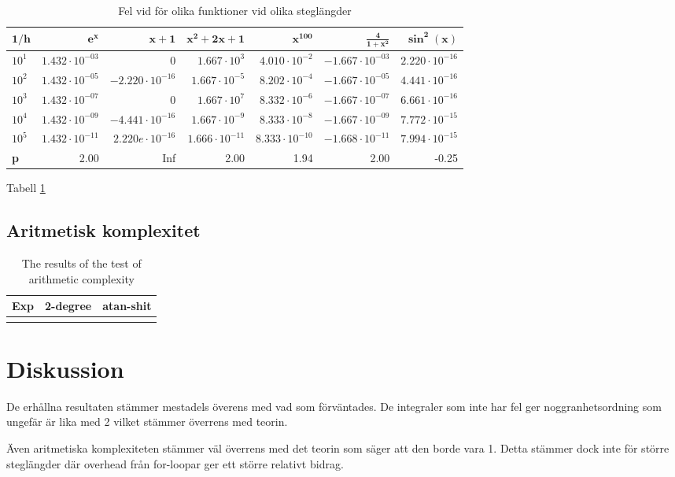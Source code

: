 \documentclass[a4paper,titlepage]{article}
\begin{document}
\begin{table}[h]
    \begin{tabular}{l | r | r | r | r | r | r}
        $\mathbf{1/h}$ & $\mathbf{e^x}$ & $\mathbf{x + 1}$ & $\mathbf{x^2 + 2x + 1}$ & $\mathbf{x^{100}}$ & $\mathbf{\frac{4}{1 + x^2}}$ & $\mathbf{\sin^2(x)}$ \\ \hline
        $10^1$         & $1.432 \cdot 10^{-03}$ & $0                    $  & $1.667 \cdot 10^{3}  $ & $4.010 \cdot 10^{-2} $ & $-1.667 \cdot 10^{-03}$ & $2.220 \cdot 10^{-16}$ \\
        $10^2$         & $1.432 \cdot 10^{-05}$ & $-2.220 \cdot 10^{-16}$  & $1.667 \cdot 10^{-5} $ & $8.202 \cdot 10^{-4} $ & $-1.667 \cdot 10^{-05}$ & $4.441 \cdot 10^{-16}$ \\
        $10^3$         & $1.432 \cdot 10^{-07}$ & $0                    $  & $1.667 \cdot 10^{7}  $ & $8.332 \cdot 10^{-6} $ & $-1.667 \cdot 10^{-07}$ & $6.661 \cdot 10^{-16}$ \\
        $10^4$         & $1.432 \cdot 10^{-09}$ & $-4.441 \cdot 10^{-16}$  & $1.667 \cdot 10^{-9} $ & $8.333 \cdot 10^{-8} $ & $-1.667 \cdot 10^{-09}$ & $7.772 \cdot 10^{-15}$ \\
        $10^5$         & $1.432 \cdot 10^{-11}$ & $2.220e \cdot 10^{-16}$  & $1.666 \cdot 10^{-11}$ & $8.333 \cdot 10^{-10}$ & $-1.668 \cdot 10^{-11}$ & $7.994 \cdot 10^{-15}$ \\ \hline
        \textbf{p}     & 2.00                   & Inf                      & 2.00                   & 1.94                   & 2.00                    & -0.25 \\
    \end{tabular}
    \caption{Fel vid för olika funktioner vid olika steglängder}
    \label{tab:errors}
\end{table}

Tabell \ref{tab:errors}

\subsection{Aritmetisk komplexitet}

\begin{table}[h]
    \begin{tabular}{l | l | l}
        \textbf{Exp} & \textbf{2-degree} & \textbf{atan-shit} \\ \hline

    \caption{The results of the test of arithmetic complexity}
    \end{tabular}
\end{table}


\section{Diskussion}

De erhållna resultaten stämmer mestadels överens med vad som förväntades. De integraler
som inte har fel ger noggranhetsordning som ungefär är lika med 2 vilket stämmer överrens
med teorin.

Även aritmetiska komplexiteten stämmer väl överrens med det teorin som säger att
den borde vara 1. Detta stämmer dock inte för större steglängder där overhead från
for-loopar ger ett större relativt bidrag.
\end{document}

